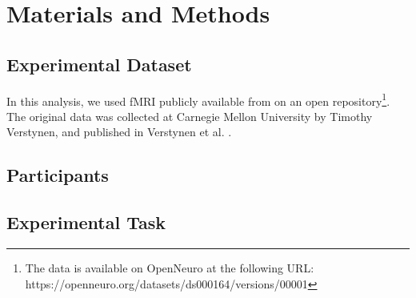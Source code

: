 \documentclass[10pt,letterpaper]{article}
\begin{document}

\section{Materials and Methods}

\subsection{Experimental Dataset}

In this analysis, we used fMRI publicly available from on an open repository\footnote{The data is available on OpenNeuro at the following URL:  https://openneuro.org/datasets/ds000164/versions/00001}. The original data was collected at Carnegie Mellon University by Timothy Verstynen, and published in Verstynen et al. \cite{Verstynen2014}.

\subsection{Participants}

\subsection{Experimental Task}
\end{document}
